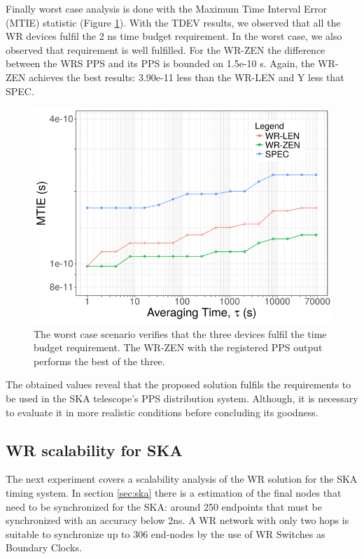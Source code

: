 Finally worst case analysis is done with the Maximum Time Interval Error (MTIE) 
statistic (Figure \ref{fig:mtie_exp1}). With the TDEV results, we observed that 
all the WR devices fulfil the 2 ns time budget requirement. In the worst case, 
we also observed that requirement is well fulfilled. For the WR-ZEN the 
difference between the WRS PPS and its PPS is bounded on 1.5e-10 s. Again, the 
WR-ZEN achieves the best results: 3.90e-11 less than the WR-LEN and Y less that 
SPEC.

\begin{figure}
	\centering
	\includegraphics[width=0.7\linewidth]{img/mtie_exp1}
	\caption[MTIE for the WR devices comparison.]{The worst case scenario 
	verifies that the three devices fulfil the time budget requirement. The 
	WR-ZEN with the registered PPS output performs the best of the three.}
	\label{fig:mtie_exp1}
\end{figure}


The obtained values reveal that the proposed solution fulfils the requirements 
to be used in the SKA telescope's PPS distribution system. Although, it is 
necessary to evaluate it in more realistic conditions before concluding its 
goodness.

\subsection{WR scalability for SKA}
\label{subsec: net_exp}

The next experiment covers a scalability analysis of the WR solution for the 
SKA timing system. In section \ref{sec:ska} there is a estimation of the final 
nodes that need to be synchronized for the SKA: around 250 endpoints that 
must be synchronized with an accuracy below 2ns. A WR network with only two 
hops is suitable to synchronize up to 306 end-nodes by the use of WR Switches as 
Boundary Clocks.

